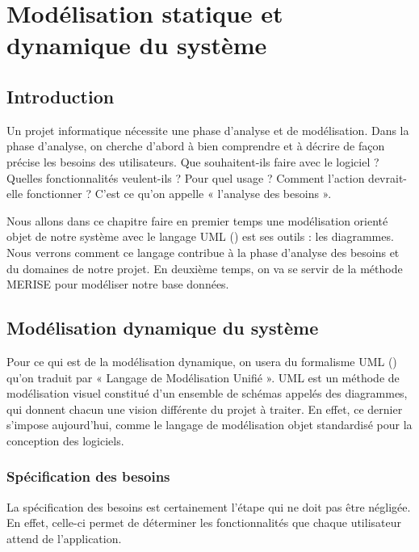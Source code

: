 \chapter{Modélisation statique et dynamique du système}
\minitoc
\newpage
\section{Introduction}
Un projet informatique nécessite une phase d'analyse et de modélisation. Dans la phase d'analyse, on cherche d'abord à bien comprendre et à décrire de façon précise les besoins des utilisateurs. Que souhaitent-ils faire avec le logiciel ? Quelles fonctionnalités veulent-ils ? Pour quel usage ? Comment l'action devrait-elle fonctionner ? C'est ce qu'on appelle « l'analyse des besoins ». 
\medskip

Nous allons dans ce chapitre faire en premier temps une modélisation orienté objet de notre système avec le langage UML () est ses outils : les diagrammes. Nous verrons comment ce langage contribue à la phase d'analyse des besoins et du domaines de notre projet. En deuxième temps, on va se servir de la méthode MERISE pour modéliser notre base données.

\section{Modélisation dynamique du système}
Pour ce qui est de la modélisation dynamique, on usera du formalisme UML () qu'on traduit par « Langage de Modélisation
Unifié ». UML est un méthode de modélisation visuel constitué d'un ensemble de schémas appelés des diagrammes, qui donnent chacun une vision différente du projet à traiter. En effet, ce dernier s'impose aujourd'hui, comme le langage de modélisation objet standardisé pour la conception des logiciels.

\subsection{Spécification des besoins}
La spécification des besoins est certainement l'étape qui ne doit pas être négligée. En effet, celle-ci permet de déterminer les fonctionnalités que chaque utilisateur attend de l'application.

